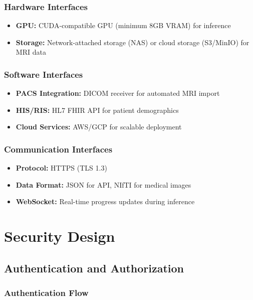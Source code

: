 \documentclass[12pt,a4paper]{article}
\begin{document}
\subsubsection{Hardware Interfaces}
\begin{itemize}
    \item \textbf{GPU:} CUDA-compatible GPU (minimum 8GB VRAM) for inference
    \item \textbf{Storage:} Network-attached storage (NAS) or cloud storage (S3/MinIO) for MRI data
\end{itemize}

\subsubsection{Software Interfaces}
\begin{itemize}
    \item \textbf{PACS Integration:} DICOM receiver for automated MRI import
    \item \textbf{HIS/RIS:} HL7 FHIR API for patient demographics
    \item \textbf{Cloud Services:} AWS/GCP for scalable deployment
\end{itemize}

\subsubsection{Communication Interfaces}
\begin{itemize}
    \item \textbf{Protocol:} HTTPS (TLS 1.3)
    \item \textbf{Data Format:} JSON for API, NIfTI for medical images
    \item \textbf{WebSocket:} Real-time progress updates during inference
\end{itemize}

\newpage

\section{Security Design}

\subsection{Authentication and Authorization}

\subsubsection{Authentication Flow}
\end{document}
